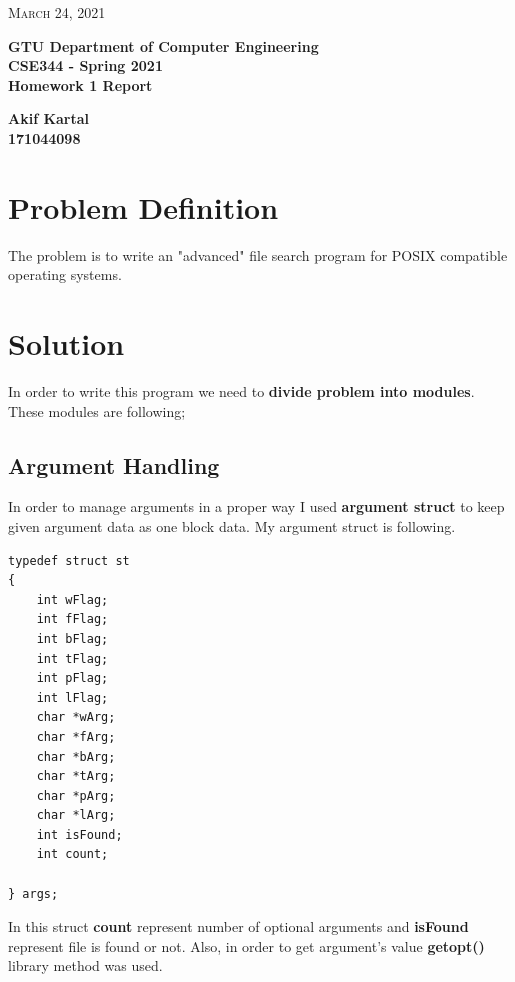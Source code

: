 \documentclass{article}
\begin{document}
\begin{titlepage}

	\begin{flushright}
	\textsc{\large March 24, 2021} \\
	\end{flushright}
	\begin{center}
	\Large{\bfseries GTU Department of Computer Engineering \\ CSE344 - Spring 2021 \\ Homework 1 Report  } \\
	\end{center}
	\vspace*{\fill}
	\begin{center}
	\Large{\bfseries Akif Kartal \\ 171044098 }
	\end{center}
	\vspace*{\fill}

\end{titlepage}

\cleardoublepage
\section{Problem Definition}
The problem is to write an "advanced" file search program for POSIX compatible operating systems. 

\section{Solution}
In order to write this program we need to \textbf{divide problem into modules}. These modules are following;

\subsection{Argument Handling}
In order to manage arguments in a proper way I used \textbf{argument struct} to keep given argument data as one block data. My argument struct is following.
\begin{lstlisting}[style=CStyle]
typedef struct st
{
    int wFlag;
    int fFlag;
    int bFlag;
    int tFlag;
    int pFlag;
    int lFlag;
    char *wArg;
    char *fArg;
    char *bArg;
    char *tArg;
    char *pArg;
    char *lArg;
    int isFound;
    int count;

} args;
\end{lstlisting}
In this struct \textbf{count} represent number of optional arguments and \textbf{isFound} represent file is found or not.
Also, in order to get argument's value \textbf{getopt()} library method was used.
\end{document}
